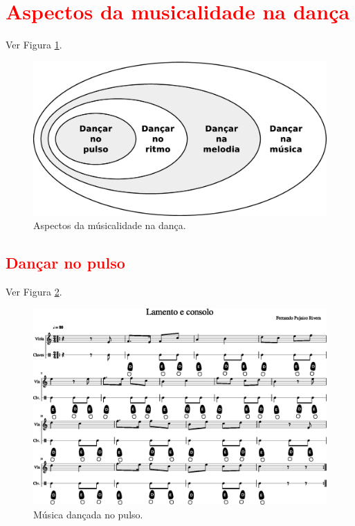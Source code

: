 \newpage

\section{\textcolor{red}{Aspectos da musicalidade na dança}}
\label{sec:aspectosusicalidade}
Ver Figura \ref{fig:aspectos-musica}.
\begin{figure}[h!]
    \centering
    \includegraphics[width=\textwidth]{chapters/cap-musicalidade-tecnica/aspectos-musica.eps}
    \caption{Aspectos da músicalidade na dança.}
    \label{fig:aspectos-musica}
\end{figure}

\subsection{\textcolor{red}{Dançar no pulso}}
Ver Figura \ref{fig:lamentoconsolopulso1}.
\begin{figure}
    \centering
    \includegraphics[width=\textwidth]{chapters/cap-musicalidade-tecnica/lamento-e-consolo-clave-pulso-1.eps}
    \caption{Música dançada no pulso.}
    \label{fig:lamentoconsolopulso1}
\end{figure}

